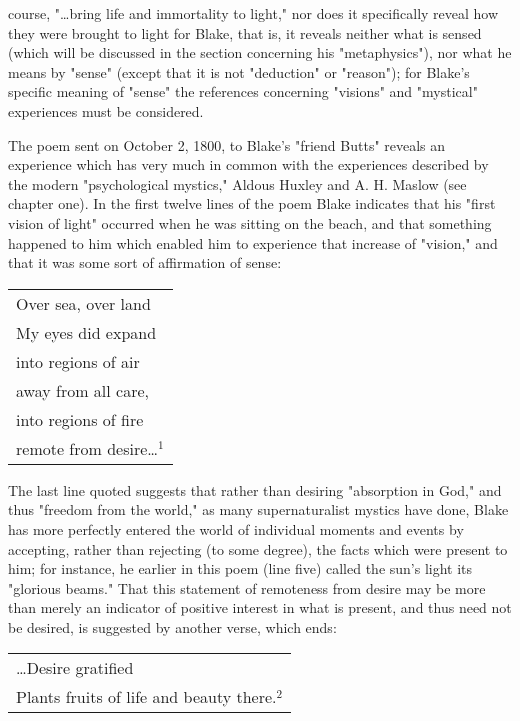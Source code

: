 \noindent course, "\dots bring life and immortality to light," nor does it specifically
reveal how they were brought to light for Blake, that is, it reveals neither
what is sensed (which will be discussed in the section concerning his "metaphysics"), nor
what he means by "sense" (except that it is not "deduction" or "reason"); for Blake's specific meaning of
"sense" the references concerning "visions" and "mystical" experiences must be considered.\par
\vspace*{0.5\baselineskip}
The poem sent on October 2, 1800, to Blake's "friend Butts" reveals an experience which has very much in common with
the experiences described by the modern "psychological mystics," Aldous Huxley and A. H. Maslow (see chapter one).
In the first twelve lines of the poem Blake indicates that his "first vision of light" occurred when he was sitting
on the beach, and that something happened to him which enabled him to experience that increase of "vision," and that
it was some sort of affirmation of sense:\par
\begin{center}
	\parbox{0.8\textwidth}{
		\centering
		\begin{tabular}{l}
			Over sea, over land  \\
			My eyes did expand   \\
			into regions of air  \\
			away from all care,  \\
			into regions of fire \\
			remote from desire\dots$^{1}$
		\end{tabular}
	}%
\end{center}
\hspace*{5mm}The last line quoted suggests that rather than desiring "absorption in God," and thus "freedom from the world,"
as many supernaturalist mystics have done, Blake has more perfectly entered the world of individual moments and events
by accepting, rather than rejecting (to some degree), the facts which were present to him; for instance,
he earlier in this poem (line five) called the sun's light its "glorious beams." That
this statement of remoteness from desire may be more than merely an indicator of positive interest in
what is present, and thus need not be desired, is suggested by another verse, which ends:\par
\begin{center}
	\parbox{0.8\textwidth}{
		\centering
		\begin{tabular}{l}
			\dots Desire gratified \\
			Plants fruits of life and beauty there.$^{2}$
		\end{tabular}
	}%
\end{center}

